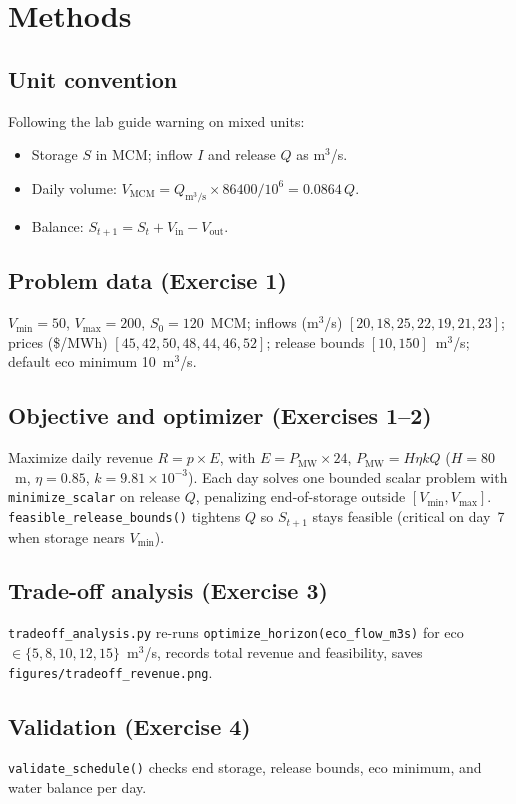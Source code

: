 \documentclass[11pt,a4paper]{article}
\begin{document}
\section{Methods}

\subsection{Unit convention}
Following the lab guide warning on mixed units:
\begin{itemize}[noitemsep]
  \item Storage $S$ in MCM; inflow $I$ and release $Q$ as m$^3$/s.
  \item Daily volume: $V_{\mathrm{MCM}} = Q_{\mathrm{m^3/s}} \times 86400 / 10^6 = 0.0864\,Q$.
  \item Balance: $S_{t+1} = S_t + V_{\mathrm{in}} - V_{\mathrm{out}}$.
\end{itemize}

\subsection{Problem data (Exercise 1)}
$V_{\min}=50$, $V_{\max}=200$, $S_0=120$~MCM; inflows (m$^3$/s) $[20,18,25,22,19,21,23]$; prices (\$/MWh) $[45,42,50,48,44,46,52]$; release bounds $[10,150]$~m$^3$/s; default eco minimum 10~m$^3$/s.

\subsection{Objective and optimizer (Exercises 1--2)}
Maximize daily revenue $R = p \times E$, with $E = P_{\mathrm{MW}} \times 24$, $P_{\mathrm{MW}} = H \eta k Q$ ($H{=}80$~m, $\eta{=}0.85$, $k{=}9.81\times10^{-3}$). Each day solves one bounded scalar problem with \texttt{minimize\_scalar} on release $Q$, penalizing end-of-storage outside $[V_{\min},V_{\max}]$. \texttt{feasible\_release\_bounds()} tightens $Q$ so $S_{t+1}$ stays feasible (critical on day~7 when storage nears $V_{\min}$).

\subsection{Trade-off analysis (Exercise 3)}
\texttt{tradeoff\_analysis.py} re-runs \texttt{optimize\_horizon(eco\_flow\_m3s)} for eco $\in\{5,8,10,12,15\}$~m$^3$/s, records total revenue and feasibility, saves \texttt{figures/tradeoff\_revenue.png}.

\subsection{Validation (Exercise 4)}
\texttt{validate\_schedule()} checks end storage, release bounds, eco minimum, and water balance per day.
\end{document}
